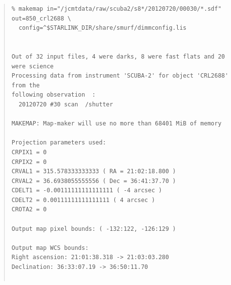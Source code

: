 \documentclass[twoside,11pt]{article}
\renewcommand{\_}{\texttt{\symbol{95}}}
\newenvironment{myquote}{\begin{quote}\begin{small}}{\end{small}\end{quote}}
\begin{document}
\begin{myquote}
\begin{verbatim}
% makemap in="/jcmtdata/raw/scuba2/s8*/20120720/00030/*.sdf" out=850_crl2688 \
  config=^$STARLINK_DIR/share/smurf/dimmconfig.lis


Out of 32 input files, 4 were darks, 8 were fast flats and 20 were science
Processing data from instrument 'SCUBA-2' for object 'CRL2688' from the
following observation  :
  20120720 #30 scan  /shutter

MAKEMAP: Map-maker will use no more than 68401 MiB of memory

Projection parameters used:
CRPIX1 = 0
CRPIX2 = 0
CRVAL1 = 315.578333333333 ( RA = 21:02:18.800 )
CRVAL2 = 36.6938055555556 ( Dec = 36:41:37.70 )
CDELT1 = -0.00111111111111111 ( -4 arcsec )
CDELT2 = 0.00111111111111111 ( 4 arcsec )
CROTA2 = 0

Output map pixel bounds: ( -132:122, -126:129 )

Output map WCS bounds:
Right ascension: 21:01:38.318 -> 21:03:03.280
Declination: 36:33:07.19 -> 36:50:11.70


\end{verbatim}
\end{myquote}
\end{document}
